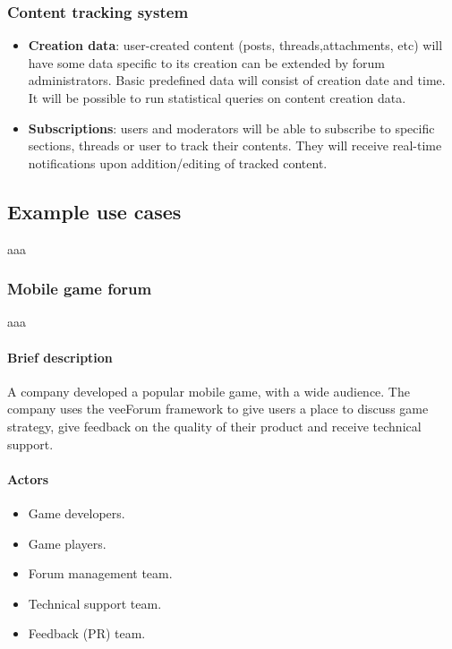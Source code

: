 \documentclass[12pt]{report}
\renewcommand\emph{\textbf}
\begin{document}
                      \subsubsection{Content tracking system}
                        \begin{itemize}
                            \item \emph{Creation data}: user-created content (posts, threads,attachments, etc) will have some data specific to its creation can be extended by forum administrators. Basic predefined data will consist of creation date and time. It will be possible to run statistical queries on content creation data.
                            \item \emph{Subscriptions}: users and moderators will be able to subscribe to specific sections, threads or user to track their contents. They will receive real-time notifications upon addition/editing of tracked content.
                        \end{itemize}

                \subsection{Example use cases}
                    aaa

                    \subsubsection{Mobile game forum}
                        aaa

                        \paragraph{Brief description}
                            A company developed a popular mobile game, with a wide audience.
                            The company uses the veeForum framework to give users a place to discuss game strategy, give feedback on the quality of their product and receive technical support.

                        \paragraph{Actors}
                            \begin{itemize}
                                \item Game developers.
                                \item Game players.
                                \item Forum management team.
                                \item Technical support team.
                                \item Feedback (PR) team.
                            \end{itemize}
\end{document}

